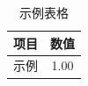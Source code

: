 \begin{table}[htbp]
  \centering
  \caption{示例表格}
  \label{tab:example}
  \begin{tabular}{lc}
    \toprule
    项目 & 数值 \\
    \midrule
    示例 & 1.00 \\
    \bottomrule
  \end{tabular}
\end{table}
